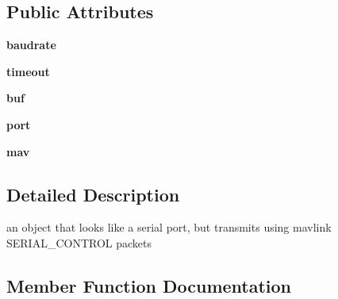 \subsection*{Public Attributes}
\begin{DoxyCompactItemize}
\item 
\mbox{\label{classpymavlink_1_1mavutil_1_1MavlinkSerialPort_ab3e0c5df3be011a0a9f99cc75a87ac55}} 
{\bfseries baudrate}
\item 
\mbox{\label{classpymavlink_1_1mavutil_1_1MavlinkSerialPort_a4d25142b726458574a0e15fc6cf97d04}} 
{\bfseries timeout}
\item 
\mbox{\label{classpymavlink_1_1mavutil_1_1MavlinkSerialPort_ab05f0e2119e3e65e0f72b7ba79c28ca6}} 
{\bfseries buf}
\item 
\mbox{\label{classpymavlink_1_1mavutil_1_1MavlinkSerialPort_ad3f20565efc5c2bdfd09fc94dc1190a6}} 
{\bfseries port}
\item 
\mbox{\label{classpymavlink_1_1mavutil_1_1MavlinkSerialPort_a49f58191e0fec19e33e4f2c4c4217dce}} 
{\bfseries mav}
\end{DoxyCompactItemize}


\subsection{Detailed Description}
\begin{DoxyVerb}an object that looks like a serial port, but
transmits using mavlink SERIAL_CONTROL packets\end{DoxyVerb}
 

\subsection{Member Function Documentation}
\mbox{\label{classpymavlink_1_1mavutil_1_1MavlinkSerialPort_a1eb7dbf7a42f76566838ef6552789fcc}} 
